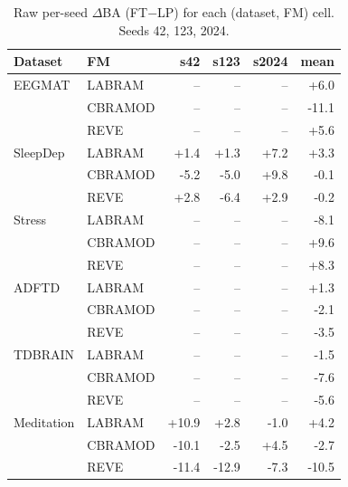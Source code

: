 \begin{table}[t]
\centering
\caption{Raw per-seed $\Delta$BA (FT$-$LP) for each (dataset, FM) cell. Seeds 42, 123, 2024.}
\label{tab:raw_seeds}
\begin{tabular}{llrrrr}
\toprule
Dataset & FM & s42 & s123 & s2024 & mean \\
\midrule
EEGMAT & LABRAM & -- & -- & -- & +6.0 \\
 & CBRAMOD & -- & -- & -- & -11.1 \\
 & REVE & -- & -- & -- & +5.6 \\
SleepDep & LABRAM & +1.4 & +1.3 & +7.2 & +3.3 \\
 & CBRAMOD & -5.2 & -5.0 & +9.8 & -0.1 \\
 & REVE & +2.8 & -6.4 & +2.9 & -0.2 \\
Stress & LABRAM & -- & -- & -- & -8.1 \\
 & CBRAMOD & -- & -- & -- & +9.6 \\
 & REVE & -- & -- & -- & +8.3 \\
ADFTD & LABRAM & -- & -- & -- & +1.3 \\
 & CBRAMOD & -- & -- & -- & -2.1 \\
 & REVE & -- & -- & -- & -3.5 \\
TDBRAIN & LABRAM & -- & -- & -- & -1.5 \\
 & CBRAMOD & -- & -- & -- & -7.6 \\
 & REVE & -- & -- & -- & -5.6 \\
Meditation & LABRAM & +10.9 & +2.8 & -1.0 & +4.2 \\
 & CBRAMOD & -10.1 & -2.5 & +4.5 & -2.7 \\
 & REVE & -11.4 & -12.9 & -7.3 & -10.5 \\
\bottomrule
\end{tabular}
\end{table}
